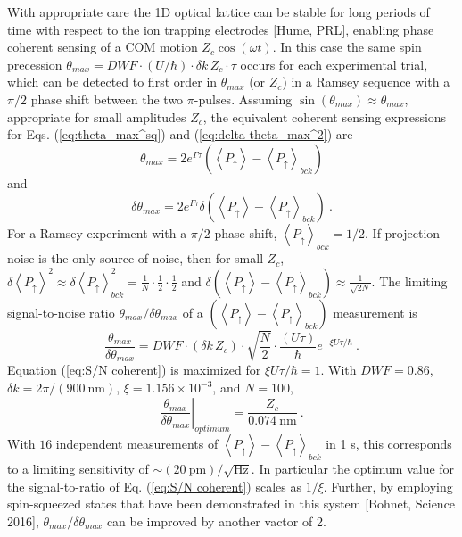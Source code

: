 \documentclass[aps,prl,superscriptaddress,floatfix]{revtex4-1}
\begin{document}
With appropriate care the 1D optical lattice can be stable for long
periods of time with respect to the ion trapping electrodes {[}Hume,
PRL{]}, enabling phase coherent sensing of a COM motion $Z_{c}\cos(\omega t)$.
In this case the same spin precession $\theta_{max}=DWF\cdot\left(U/\hbar\right)\cdot\delta k\,Z_{c}\cdot\tau$
occurs for each experimental trial, which can be detected to first
order in $\theta_{max}$ (or $Z_{c}$) in a Ramsey sequence with a
$\pi/2$ phase shift between the two $\pi$-pulses. Assuming $\sin\left(\theta_{max}\right)\approx\theta_{max}$,
appropriate for small amplitudes $Z_{c}$, the equivalent coherent
sensing expressions for Eqs. (\ref{eq:theta_max^sq}) and (\ref{eq:delta theta_max^2})
are
\begin{equation}
\theta_{max}=2e^{\Gamma\tau}\left(\left\langle P_{\uparrow}\right\rangle -\left\langle P_{\uparrow}\right\rangle _{bck}\right)\label{eq:theta_max coherent}
\end{equation}
and
\begin{equation}
\delta\theta_{max}=2e^{\Gamma\tau}\delta\left(\left\langle P_{\uparrow}\right\rangle -\left\langle P_{\uparrow}\right\rangle _{bck}\right)\:.\label{eq:delta theta_max coherent}
\end{equation}
For a Ramsey experiment with a $\pi/2$ phase shift, $\left\langle P_{\uparrow}\right\rangle _{bck}=1/2$.
If projection noise is the only source of noise, then for small $Z_{c}$,
$\delta\left\langle P_{\uparrow}\right\rangle ^{2}\approx\delta\left\langle P_{\uparrow}\right\rangle _{bck}^{2}=\frac{1}{N}\cdot\frac{1}{2}\cdot\frac{1}{2}$
and $\delta\left(\left\langle P_{\uparrow}\right\rangle -\left\langle P_{\uparrow}\right\rangle _{bck}\right)\approx\frac{1}{\sqrt{2N}}$.
The limiting signal-to-noise ratio $\theta_{max}/\delta\theta_{max}$
of a $\left(\left\langle P_{\uparrow}\right\rangle -\left\langle P_{\uparrow}\right\rangle _{bck}\right)$
measurement is
\begin{equation}
\frac{\theta_{max}}{\delta\theta_{max}}=DWF\cdot\left(\delta k\,Z_{c}\right)\cdot\sqrt{\frac{N}{2}}\cdot\frac{\left(U\tau\right)}{\hbar}e^{-\xi U\tau/\hbar}\:.\label{eq:S/N coherent}
\end{equation}
Equation (\ref{eq:S/N coherent}) is maximized for $\xi U\tau/\hbar=1$.
With $DWF=0.86$, $\delta k=2\pi/\left(900\:\mathrm{nm}\right)$,
$\xi=1.156\times10^{-3}$, and $N=100$,
\begin{equation}
\left.\frac{\theta_{max}}{\delta\theta_{max}}\right|_{optimum}=\frac{Z_{c}}{0.074\:\mathrm{nm}}\:.\label{eq:coherent optimum}
\end{equation}
With $16$ independent measurements of $\left\langle P_{\uparrow}\right\rangle -\left\langle P_{\uparrow}\right\rangle _{bck}$
in 1 s, this corresponds to a limiting sensitivity of $\sim\left(20\:\mathrm{pm}\right)/\sqrt{\mathrm{Hz}}$.
In particular the optimum value for the signal-to-ratio of Eq. (\ref{eq:S/N coherent})
scales as $1/\xi$. Further, by employing spin-squeezed states that
have been demonstrated in this system {[}Bohnet, Science 2016{]},
$\theta_{max}/\delta\theta_{max}$ can be improved by another vactor
of 2.
\end{document}
